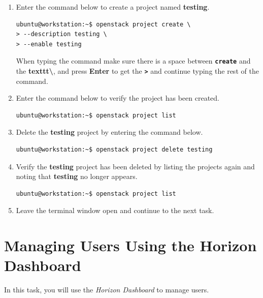 \documentclass[letterpaper, 12pt]{article}
\begin{document}
\begin{enumerate}
    \item Enter the command below to create a project named \textbf{testing}.
\begin{lstlisting}
ubuntu@workstation:~$ openstack project create \
> --description testing \
> --enable testing
\end{lstlisting}

    \begin{tipbox}{}
        When typing the command make sure there is a space between \textbf{\texttt{create}} and the
        \textbf{texttt{\textbackslash}}, and press \textbf{Enter} to get the \textbf{\texttt{>}} and continue typing the
        rest of the command.
    \end{tipbox}

    \item Enter the command below to verify the project has been created.
\begin{lstlisting}
ubuntu@workstation:~$ openstack project list
\end{lstlisting}

    \item Delete the \textbf{testing} project by entering the command below.
\begin{lstlisting}
ubuntu@workstation:~$ openstack project delete testing
\end{lstlisting}

    \item Verify the \textbf{testing} project has been deleted by listing the projects again and noting that
    \textbf{testing} no longer appears.
\begin{lstlisting}
ubuntu@workstation:~$ openstack project list
\end{lstlisting}

    \item Leave the terminal window open and continue to the next task.
\end{enumerate}

\section{Managing Users Using the Horizon Dashboard}
\label{sec:managing_users_using_the_horizon_dashboard}
In this task, you will use the \textit{Horizon Dashboard} to manage users.
\end{document}
